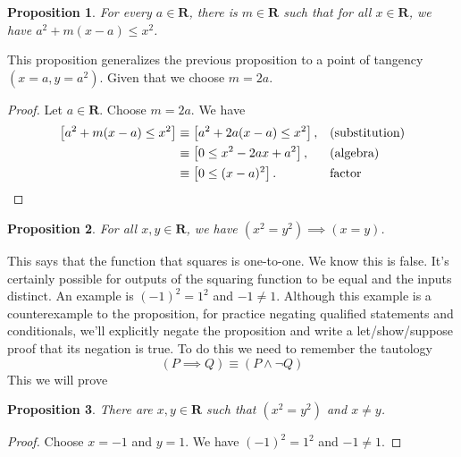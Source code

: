 \documentclass[12pt,fleqn]{article}
\newcommand{\reals}{\mathbf{R}}
\newenvironment{myproof}
  {\begin{shaded}\begin{proof}}
  {\end{proof}\end{shaded}}
\newtheorem{prop}{Proposition}
\begin{document}
     \begin{prop} For every $a \in \reals$, there is $m \in \reals$ such 
     that for all $x \in \reals$, we have $a^2 + m(x-a) \leq x^2$.
     \end{prop}
     This proposition generalizes the previous proposition to a point of tangency $(x=a,y=a^2)$. Given that we choose $m=2a$. 

      \begin{myproof} 
      Let $a \in \reals$. Choose $m=2a$. We have
      \begin{align*}
       \left[{a^2+m(x-a) \le x^2} \right]   
       &\equiv \left[a^2+2a(x-a)\le x^2\right], &&\text{(substitution)}\\
      &\equiv \left[0 \le x^2-2ax+a^2\right], &&\text{(algebra)}\\
      &\equiv \left[0 \le (x-a)^2\right]. &&\text{factor}  \qedhere
      \end{align*}
  \end{myproof}

     \begin{prop} For all $x,y \in \reals$, we have $(x^2 = y^2) \implies (x=y)$. 
     \end{prop} 
    \noindent This says that the function that squares is one-to-one. We know this is false. It's certainly possible for outputs of 
    the squaring function to be equal and the inputs distinct. An example is $(-1)^2 = 1^2$ and $-1 \neq 1$. Although this example
    is a counterexample to the proposition, for  practice negating qualified statements and conditionals,  we'll explicitly negate the proposition and write a let/show/suppose  proof that its negation is true.
    To do this we need to remember the tautology
    \begin{equation*}
       \left(P \implies Q\right) \equiv \left(P \land \lnot Q\right)
 \end{equation*}
   This we will prove
    \begin{prop} There are $x,y \in \reals$ such that  $(x^2 = y^2)$ and $x\neq y$. 
     \end{prop} 
     
     \begin{myproof} Choose $x=-1$ and $y=1$. We have $(-1)^2 = 1^2$ and $-1 \neq 1$.      \end{myproof}
\end{document}
